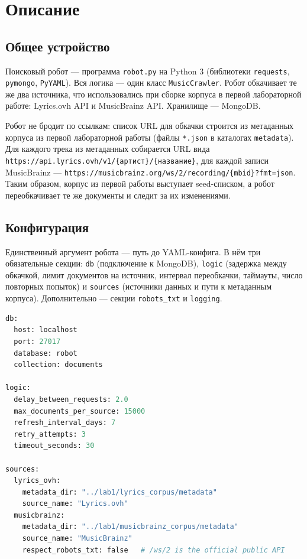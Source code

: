 \section{Описание}

\subsection{Общее устройство}
Поисковый робот --- программа \texttt{robot.py} на Python 3 (библиотеки
\texttt{requests}, \texttt{pymongo}, \texttt{PyYAML}). Вся логика --- один класс
\texttt{MusicCrawler}. Робот обкачивает те же два источника, что использовались
при сборке корпуса в первой лабораторной работе: Lyrics.ovh API и MusicBrainz
API. Хранилище --- MongoDB.

Робот не бродит по ссылкам: список URL для обкачки строится из метаданных
корпуса из первой лабораторной работы (файлы \texttt{*.json} в каталогах
\texttt{metadata}). Для каждого трека из метаданных собирается URL вида
\texttt{https://api.lyrics.ovh/v1/\{артист\}/\{название\}}, для каждой записи
MusicBrainz --- \texttt{https://musicbrainz.org/ws/2/recording/\{mbid\}?fmt=json}.
Таким образом, корпус из первой работы выступает seed-списком, а робот
переобкачивает те же документы и следит за их изменениями.

\subsection{Конфигурация}
Единственный аргумент робота --- путь до YAML-конфига. В нём три обязательные
секции: \texttt{db} (подключение к MongoDB), \texttt{logic} (задержка между
обкачкой, лимит документов на источник, интервал переобкачки, таймауты, число
повторных попыток) и \texttt{sources} (источники данных и пути к метаданным
корпуса). Дополнительно --- секции \texttt{robots\_txt} и \texttt{logging}.

\begin{lstlisting}[language=Python]
db:
  host: localhost
  port: 27017
  database: robot
  collection: documents

logic:
  delay_between_requests: 2.0
  max_documents_per_source: 15000
  refresh_interval_days: 7
  retry_attempts: 3
  timeout_seconds: 30

sources:
  lyrics_ovh:
    metadata_dir: "../lab1/lyrics_corpus/metadata"
    source_name: "Lyrics.ovh"
  musicbrainz:
    metadata_dir: "../lab1/musicbrainz_corpus/metadata"
    source_name: "MusicBrainz"
    respect_robots_txt: false   # /ws/2 is the official public API
\end{lstlisting}

